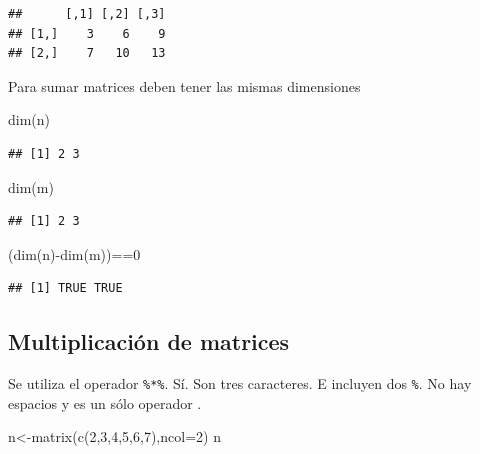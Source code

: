 \documentclass[
]{book}
\newenvironment{Shaded}{\begin{snugshade}}{\end{snugshade}}
\newcommand{\AttributeTok}[1]{\textcolor[rgb]{0.77,0.63,0.00}{#1}}
\newcommand{\DecValTok}[1]{\textcolor[rgb]{0.00,0.00,0.81}{#1}}
\newcommand{\FunctionTok}[1]{\textcolor[rgb]{0.00,0.00,0.00}{#1}}
\newcommand{\NormalTok}[1]{#1}
\newcommand{\OtherTok}[1]{\textcolor[rgb]{0.56,0.35,0.01}{#1}}
\newcommand{\SpecialCharTok}[1]{\textcolor[rgb]{0.00,0.00,0.00}{#1}}
\begin{document}
\begin{verbatim}
##      [,1] [,2] [,3]
## [1,]    3    6    9
## [2,]    7   10   13
\end{verbatim}

Para sumar matrices deben tener las mismas dimensiones

\begin{Shaded}
\begin{Highlighting}[]
\FunctionTok{dim}\NormalTok{(n)}
\end{Highlighting}
\end{Shaded}

\begin{verbatim}
## [1] 2 3
\end{verbatim}

\begin{Shaded}
\begin{Highlighting}[]
\FunctionTok{dim}\NormalTok{(m)}
\end{Highlighting}
\end{Shaded}

\begin{verbatim}
## [1] 2 3
\end{verbatim}

\begin{Shaded}
\begin{Highlighting}[]
\NormalTok{(}\FunctionTok{dim}\NormalTok{(n)}\SpecialCharTok{{-}}\FunctionTok{dim}\NormalTok{(m))}\SpecialCharTok{==}\DecValTok{0}
\end{Highlighting}
\end{Shaded}

\begin{verbatim}
## [1] TRUE TRUE
\end{verbatim}

\hypertarget{multiplicaciuxf3n-de-matrices}{%
\subsection{Multiplicación de matrices}\label{multiplicaciuxf3n-de-matrices}}

Se utiliza el operador \texttt{\%*\%}. Sí. Son tres caracteres. E incluyen dos \texttt{\%}.
No hay espacios y es un sólo operador .

\begin{Shaded}
\begin{Highlighting}[]
\NormalTok{n}\OtherTok{\textless{}{-}}\FunctionTok{matrix}\NormalTok{(}\FunctionTok{c}\NormalTok{(}\DecValTok{2}\NormalTok{,}\DecValTok{3}\NormalTok{,}\DecValTok{4}\NormalTok{,}\DecValTok{5}\NormalTok{,}\DecValTok{6}\NormalTok{,}\DecValTok{7}\NormalTok{),}\AttributeTok{ncol=}\DecValTok{2}\NormalTok{)}
\NormalTok{n}
\end{Highlighting}
\end{Shaded}
\end{document}
